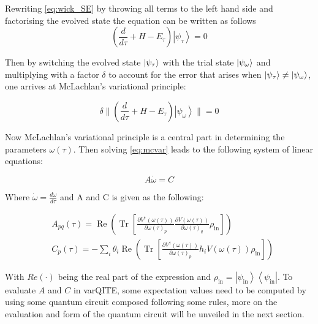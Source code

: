 \documentclass[../main.tex]{subfiles}
\begin{document}
Rewriting \autoref{eq:wick_SE} by throwing all terms to the left hand side and factorising the evolved state the equation can be written as follows
\begin{equation}
    \left(\frac{d}{d \tau}+H-E_{\tau}\right)\left|\psi_{\tau}\right\rangle=0
\end{equation}

Then by switching the evolved state $\ket{\psi_\tau}$ with the trial state $\ket{\psi_\omega}$ and multiplying with a factor $\delta$ to account for the error that arises when $\ket{\psi_\tau} \neq \ket{\psi_\omega}$, one arrives at McLachlan's variational principle:

\begin{equation}
\delta \|\left(\frac{d}{d \tau}+H-E_{\tau}\right)\left|\psi_{\omega}\right\rangle \|=0
\label{eq:mcvar}
\end{equation}

Now McLachlan's variational principle is a central part in determining the parameters $\omega(\tau)$. Then solving \autoref{eq:mcvar} leads to the following system of linear equations:

\begin{equation}
A \dot{\omega}=C
\label{eq:AwC}
\end{equation}

Where $\dot{\omega}=\frac{d\omega}{d \tau}$ and A and C is given as the following:

\begin{equation}
\begin{aligned}
&A_{p q}(\tau)=\operatorname{Re}\left(\operatorname{Tr}\left[\frac{\partial V^{\dagger}(\omega(\tau))}{\partial \omega(\tau)_{p}} \frac{\partial V(\omega(\tau))}{\partial \omega(\tau)_{q}} \rho_{\mathrm{in}}\right]\right) \\
&C_{p}(\tau)=-\sum_{i} \theta_{i} \operatorname{Re}\left(\operatorname{Tr}\left[\frac{\partial V^{\dagger}(\omega(\tau))}{\partial \omega(\tau)_{p}} h_{i} V(\omega(\tau)) \rho_{\mathrm{in}}\right]\right)
\end{aligned}
\label{eq:A_and_C}
\end{equation}

With $Re(\cdot)$ being the real part of the expression and $\rho_{\mathrm{in}}=\left|\psi_{\mathrm{in}}\right\rangle\left\langle\psi_{\mathrm{in}}\right|$. To evaluate $A$ and $C$ in varQITE, some expectation values need to be computed by using some quantum circuit composed following some rules, more on the evaluation and form of the quantum circuit will be unveiled in the next section.
\end{document}
